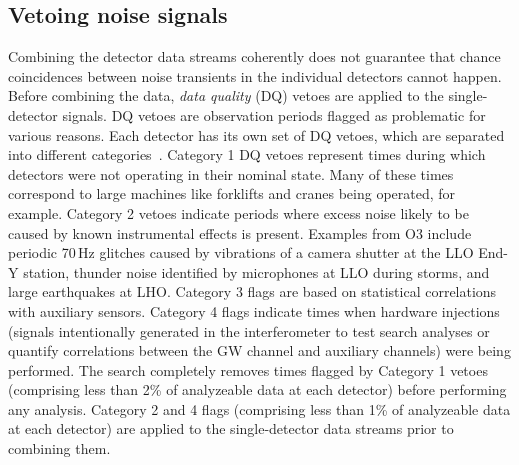 \subsection{Vetoing noise signals}

Combining the detector data streams coherently does not guarantee that chance coincidences between noise transients in the individual detectors cannot happen.
Before combining the data, \textit{data quality} (DQ) vetoes are applied to the single-detector signals.
DQ vetoes are observation periods flagged as problematic for various reasons.
Each detector has its own set of DQ vetoes, which are separated into different categories~\citep{Davis_2021, Davis_2021b}.
Category 1 DQ vetoes represent times during which detectors were not operating in their nominal state.
Many of these times correspond to large machines like forklifts and cranes being operated, for example.
Category 2 vetoes indicate periods where excess noise likely to be caused by known instrumental effects is present.
Examples from O3 include periodic 70\,Hz glitches caused by vibrations of a camera shutter at the LLO End-Y station, thunder noise identified by microphones at LLO during storms, and large earthquakes at LHO.
Category 3 flags are based on statistical correlations with auxiliary sensors.
Category 4 flags indicate times when hardware injections (signals intentionally generated in the interferometer to test search analyses or quantify correlations between the GW channel and auxiliary channels) were being performed.
The \xpip search completely removes times flagged by Category 1 vetoes (comprising less than 2\% of analyzeable data at each detector) before performing any analysis.
Category 2 and 4 flags (comprising less than 1\% of analyzeable data at each detector) are applied to the single-detector data streams prior to combining them.

